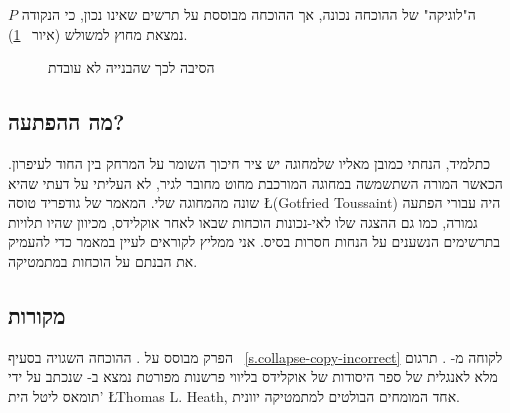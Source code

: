 ה"לוגיקה" של ההוכחה נכונה, אך ההוכחה מבוססת על תרשים שאינו נכון, כי הנקודה
$P$
נמצאת מחוץ למשולש (איור%
~\ref{f.isoceles-wrong}).
\begin{figure}[tb]
\begin{center}
\caption{הסיבה לכך שהבנייה לא עובדת}\label{f.isoceles-wrong}
\end{center}
\end{figure}

\subsection*{מה ההפתעה?}

כתלמיד, הנחתי כמובן מאליו שלמחוגה יש ציר חיכוך השומר על המרחק בין החוד לעיפרון. הכאשר המורה השתשמשה במחוגה המורכבת מחוט מחובר לגיר, לא העליתי על דעתי שהיא שונה מהמחוגה שלי. המאמר של גודפריד טוסה
\L{(Gotfried Toussaint)}
היה עבורי הפתעה גמורה, כמו גם ההצגה שלו לאי-נכונות הוכחות שבאו לאחר אוקלידס, מכיוון שהיו תלויות בתרשימים הנשענים על הנחות חסרות בסיס. אני ממליץ לקוראים לעיין במאמר כדי להעמיק את הבנתם על הוכחות במתמטיקה.

\subsection*{מקורות}

הפרק מבוסס על
\cite{toussaint}.
ההוכחה השגויה בסעיף%
~\ref{s.collapse-copy-incorrect}
לקוחה מ-%
\cite{rusty}.
תרגום מלא לאנגלית של ספר היסודות
של אוקלידס
בליווי פרשנות מפורטת נמצא ב-%
\cite{euclid}
שנכתב על ידי תומאס ליטל הית'
\L{Thomas L. Heath},
אחד המומחים הבולטים למתמטיקה יוונית.

